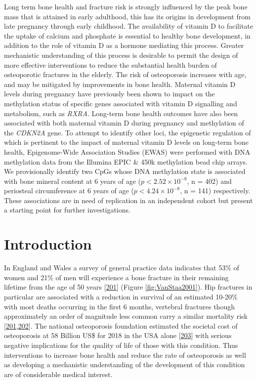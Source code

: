 \documentclass[
]{book}
\begin{document}
Long term bone health and fracture risk is strongly influenced by the peak bone mass that is attained in early adulthood, this has its origins in development from late pregnancy through early childhood.
The availability of vitamin D to facilitate the uptake of calcium and phosphate is essential to healthy bone development, in addition to the role of vitamin D as a hormone mediating this process.
Greater mechanistic understanding of this process is desirable to permit the design of more effective interventions to reduce the substantial health burden of osteoporotic fractures in the elderly.
The risk of osteoporosis increases with age, and may be mitigated by improvements in bone health.
Maternal vitamin D levels during pregnancy have previously been shown to impact on the methylation status of specific genes associated with vitamin D signalling and metabolism, such as \emph{RXRA}.
Long-term bone health outcomes have also been associated with both maternal vitamin D during pregnancy and methylation of the \emph{CDKN2A} gene.
To attempt to identify other loci, the epigenetic regulation of which is pertinent to the impact of maternal vitamin D levels on long-term bone health, Epigenome-Wide Association Studies (EWAS) were performed with DNA methylation data from the Illumina EPIC \& 450k methylation bead chip arrays.
We provisionally identify two CpGs whose DNA methylation state is associated with bone mineral content at 6 years of age (\(p < 2.52\times 10^{-8}\), n = 402) and periosteal circumference at 6 years of age (\(p < 4.24\times 10^{-8}\), n = 141) respectively.
These associations are in need of replication in an independent cohort but present a starting point for further investigations.

\hypertarget{arrayIntro}{%
\section{Introduction}\label{arrayIntro}}

In England and Wales a survey of general practice data indicates that 53\% of women and 21\% of men will experience a bone fracture in their remaining lifetime from the age of 50 years {[}\protect\hyperlink{ref-VanStaa2001}{201}{]} (Figure \ref{fig:VanStaa2001}).
Hip fractures in particular are associated with a reduction in survival of an estimated 10-20\% with most deaths occurring in the first 6 months, vertebral fractures though approximately an order of magnitude less common carry a similar mortality risk {[}\protect\hyperlink{ref-VanStaa2001}{201},\protect\hyperlink{ref-Streubel2011}{202}{]}.
The national osteoporosis foundation estimated the societal cost of osteoporosis at 58 Billion US\$ for 2018 in the USA alone {[}\protect\hyperlink{ref-Thompson2018}{203}{]} with serious negative implications for the quality of life of those with this condition.
Thus interventions to increase bone health and reduce the rate of osteoporosis as well as developing a mechanistic understanding of the development of this condition are of considerable medical interest.
\end{document}
